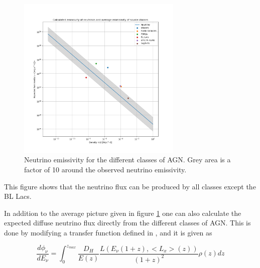 \begin{figure}[H]
    \centering
    \includegraphics[width = 0.7\textwidth]{new_plots/L_n_neut_calc.png}
    \caption{Neutrino emissivity for the different classes of AGN. Grey area is a factor of 10 around the observed neutrino emissivity.}
    \label{fig:neutrino}
\end{figure}

This figure shows that the neutrino flux can be produced by all classes except 
the BL Lacs. 


In addition to the average picture given in figure \ref*{fig:neutrino} one can also calculate the expected diffuse neutrino flux directly from the different classes of AGN. This is done by modifying a transfer function defined in \cite{Palladino_2020}, and it is given as


\begin{equation}
    \frac{d\phi_\nu}{dE_\nu} = \int_0^{z_{max}} \frac{D_H}{E(z)} \frac{L(E_\nu (1+z),<L_x>(z))}{(1+z)^2} \rho(z) dz
\end{equation}

